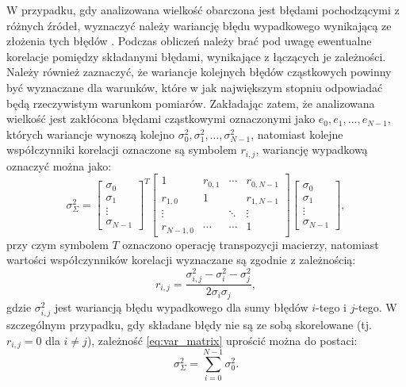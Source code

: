 W przypadku, gdy analizowana wielkość obarczona jest błędami pochodzącymi z różnych źródeł, wyznaczyć należy wariancję błędu wypadkowego wynikającą ze złożenia tych błędów \cite{wymyslo_range}. Podczas obliczeń należy brać pod uwagę ewentualne korelacje pomiędzy składanymi błędami, wynikające z łączących je zależności. Należy również zaznaczyć, że wariancje kolejnych błędów cząstkowych powinny być wyznaczane dla warunków, które w jak największym stopniu odpowiadać będą rzeczywistym warunkom pomiarów. Zakładając zatem, że analizowana wielkość jest zakłócona błędami cząstkowymi oznaczonymi jako $e_{0}, e_{1}, \hdots, e_{N-1}$, których wariancje wynoszą kolejno $\sigma_{0}^{2}, \sigma_{1}^{2}, \hdots, \sigma_{N-1}^{2}$, natomiast kolejne współczynniki korelacji \cite{jcgm_guide} oznaczone są symbolem $r_{i,j}$, wariancję wypadkową oznaczyć można jako:
\begin{equation}
\sigma_{\Sigma}^{2} =
\begin{bmatrix}
\sigma_{0} \\ \sigma_{1} \\ \vdots \\ \sigma_{N-1}
\end{bmatrix}^{T}
\begin{bmatrix}
1         & r_{0,1} & \cdots & r_{0,N-1} \\
r_{1,0}   & 1       &        & r_{1,N-1} \\
\vdots    &         & \ddots & \vdots    \\
r_{N-1,0} & \cdots  & \cdots & 1
\end{bmatrix}
\begin{bmatrix}
\sigma_{0} \\ \sigma_{1} \\ \vdots \\ \sigma_{N-1}
\end{bmatrix}
\label{eq:var_matrix},
\end{equation}
przy czym symbolem $T$ oznaczono operację transpozycji macierzy, natomiast wartości współczynników korelacji wyznaczane są zgodnie z zależnością:
\begin{equation}
r_{i,j} = \frac{\sigma_{i,j}^{2} - \sigma_{i}^{2} - \sigma_{j}^{2}}{2 \sigma_{i} \sigma_{j}} \label{eq:var_corr},
\end{equation}
gdzie $\sigma_{i,j}^{2}$ jest wariancją błędu wypadkowego dla sumy błędów $i$-tego i $j$-tego. W szczególnym przypadku, gdy składane błędy nie są ze sobą skorelowane (tj. $r_{i,j} = 0$ dla $i \ne j$), zależność \eqref{eq:var_matrix} uprościć można do postaci:
\begin{equation}
\sigma_{\Sigma}^{2} = \sum _{i = 0} ^{N-1} \sigma_{0}^{2} \label{eq:var_sum}.
\end{equation}

